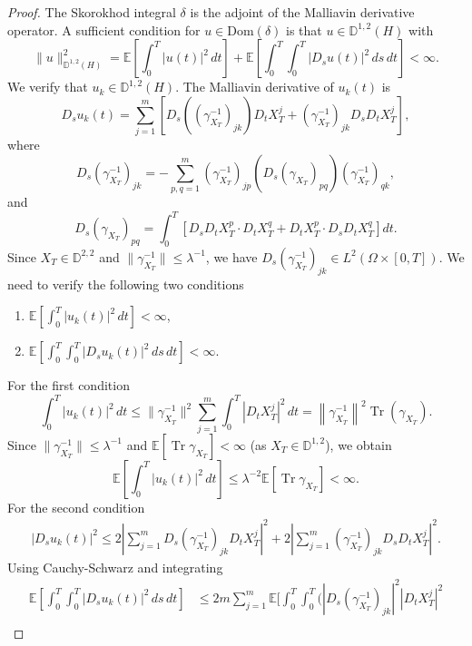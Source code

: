 \documentclass[]{interact}
\newcommand{\1}{\mathbf{1}}
\theoremstyle{plain}%
\theoremstyle{definition}
\theoremstyle{remark}
\numberwithin{equation}{section}
\begin{document}
\begin{proof}
The Skorokhod integral \(\delta\) is the adjoint of the Malliavin derivative operator. A sufficient condition for \( u \in \text{Dom}(\delta) \) is that \( u \in \mathbb{D}^{1,2}(H) \) with
\[
\| u \|_{\mathbb{D}^{1,2}(H)}^2 = \mathbb{E} \left[ \int_0^T |u(t)|^2 \, dt \right] + \mathbb{E} \left[ \int_0^T \int_0^T |D_s u(t)|^2 \, ds \, dt \right] < \infty.
\]
%
We verify that \( u_k \in \mathbb{D}^{1,2}(H) \). The Malliavin derivative of \( u_k(t) \) is
\[
D_s u_k(t) = \sum_{j=1}^m \left[ D_s \left( (\gamma_{X_T}^{-1})_{j k} \right) D_t X_T^j + (\gamma_{X_T}^{-1})_{j k} D_s D_t X_T^j \right],
\]
where
\[
D_s (\gamma_{X_T}^{-1})_{j k} = - \sum_{p, q=1}^m (\gamma_{X_T}^{-1})_{j p} (D_s (\gamma_{X_T})_{p q}) (\gamma_{X_T}^{-1})_{q k},
\]
and
\[
D_s (\gamma_{X_T})_{p q} = \int_0^T \left[ D_s D_t X_T^p \cdot D_t X_T^q + D_t X_T^p \cdot D_s D_t X_T^q \right] dt.
\]
%
Since \( X_T \in \mathbb{D}^{2,2} \) and \( \|\gamma_{X_T}^{-1}\| \leq \lambda^{-1} \), we have \( D_s (\gamma_{X_T}^{-1})_{j k} \in L^2(\Omega \times [0, T]) \).
%
We need to verify the following two conditions
\begin{enumerate}
    \item[a)] \( \mathbb{E} \left[ \int_0^T |u_k(t)|^2 \, dt \right] < \infty \),
    \item[b)] \( \mathbb{E} \left[ \int_0^T \int_0^T |D_s u_k(t)|^2 \, ds \, dt \right] < \infty \).
\end{enumerate}
%
For the first condition
\[
\int_0^T |u_k(t)|^2 \, dt \leq \| \gamma_{X_T}^{-1} \|^2 \sum_{j=1}^m \int_0^T |D_t X_T^j|^2 \, dt = \left\| \gamma_{X_T}^{-1} \right\|^2 \operatorname{Tr}\left( \gamma_{X_T}\right).
\]
Since \( \| \gamma_{X_T}^{-1} \| \leq \lambda^{-1} \) and \( \mathbb{E} \left[ \operatorname{Tr} \gamma_{X_T} \right] < \infty \) (as \( X_T \in \mathbb{D}^{1,2} \)), we obtain
\[
\mathbb{E} \left[ \int_0^T |u_k(t)|^2 \, dt \right] \leq \lambda^{-2} \mathbb{E} \left[ \operatorname{Tr} \gamma_{X_T} \right] < \infty.
\]
%
For the second condition
\begin{align}
|D_s u_k(t)|^2 \leq 2 \left| \sum_{j=1}^m D_s (\gamma_{X_T}^{-1})_{j k} D_t X_T^j \right|^2 + 2 \left| \sum_{j=1}^m (\gamma_{X_T}^{-1})_{j k} D_s D_t X_T^j \right|^2.
\end{align}
%
Using Cauchy-Schwarz and integrating
\begin{align*}
\mathbb{E} \left[ \int_0^T \int_0^T |D_s u_k(t)|^2 \, ds \, dt \right]&\leq 2m \sum_{j=1}^m \mathbb{E} \bigg[ \int_0^T \int_0^T \Big( |D_s (\gamma_{X_T}^{-1})_{j k}|^2 |D_t X_T^j|^2 \\

\end{align*}
\end{proof}
\end{document}
